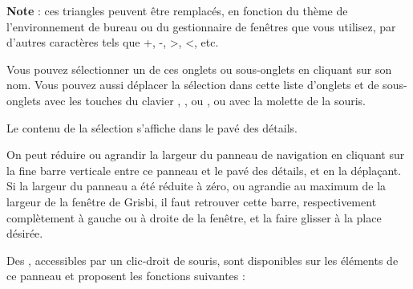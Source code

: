 \textbf{Note} : ces triangles peuvent être remplacés, en fonction du thème de l'environnement de bureau ou du gestionnaire de fenêtres que vous utilisez, par d'autres caractères tels que +, -, >, <, etc.

Vous pouvez sélectionner un de ces onglets ou sous-onglets en cliquant sur son nom. Vous pouvez aussi déplacer la sélection dans cette liste d'onglets et de sous-onglets avec les touches du clavier , ,  ou , ou avec la molette de la souris. 

Le contenu de la sélection s'affiche dans le pavé des détails. 

On peut réduire ou agrandir la largeur du panneau de navigation en cliquant sur la fine barre verticale entre ce panneau et le pavé des détails, et en la déplaçant. Si la largeur du panneau a été réduite à zéro, ou agrandie au maximum de la largeur de la fenêtre de Grisbi, il faut retrouver cette barre, respectivement complètement à gauche ou à droite de la fenêtre, et la faire glisser à la place désirée. 

Des , accessibles par un clic-droit de souris, sont disponibles sur les éléments de ce panneau et proposent les fonctions suivantes :

